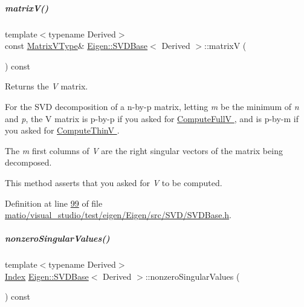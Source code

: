 \mbox{\label{group___s_v_d___module_a245a453b5e7347f737295c23133238c4}} 
\subparagraph{\texorpdfstring{matrix\+V()}{matrixV()}\hspace{0.1cm}{\footnotesize\ttfamily [2/2]}}
{\footnotesize\ttfamily template$<$typename Derived$>$ \\
const \hyperlink{group___core___module}{Matrix\+V\+Type}\& \hyperlink{group___s_v_d___module_class_eigen_1_1_s_v_d_base}{Eigen\+::\+S\+V\+D\+Base}$<$ Derived $>$\+::matrixV (\begin{DoxyParamCaption}{ }\end{DoxyParamCaption}) const\hspace{0.3cm}{\ttfamily [inline]}}

\begin{DoxyReturn}{Returns}
the {\itshape V} matrix.
\end{DoxyReturn}
For the S\+VD decomposition of a n-\/by-\/p matrix, letting {\itshape m} be the minimum of {\itshape n} and {\itshape p}, the V matrix is p-\/by-\/p if you asked for \hyperlink{group__enums_ggae3e239fb70022eb8747994cf5d68b4a9a52c6f7e80bbf9a42297c88f700245b51}{Compute\+FullV }, and is p-\/by-\/m if you asked for \hyperlink{group__enums_ggae3e239fb70022eb8747994cf5d68b4a9a1055e53fa95c8ae04a07ebb72cfafd95}{Compute\+ThinV }.

The {\itshape m} first columns of {\itshape V} are the right singular vectors of the matrix being decomposed.

This method asserts that you asked for {\itshape V} to be computed. 

Definition at line \hyperlink{matio_2visual__studio_2test_2eigen_2_eigen_2src_2_s_v_d_2_s_v_d_base_8h_source_l00099}{99} of file \hyperlink{matio_2visual__studio_2test_2eigen_2_eigen_2src_2_s_v_d_2_s_v_d_base_8h_source}{matio/visual\+\_\+studio/test/eigen/\+Eigen/src/\+S\+V\+D/\+S\+V\+D\+Base.\+h}.

\mbox{\label{group___s_v_d___module_afe8a555f38393a319a71ec0f0331c9ef}} 
\subparagraph{\texorpdfstring{nonzero\+Singular\+Values()}{nonzeroSingularValues()}\hspace{0.1cm}{\footnotesize\ttfamily [1/2]}}
{\footnotesize\ttfamily template$<$typename Derived$>$ \\
\hyperlink{group___s_v_d___module_a6229a37997eca1072b52cca5ee7a2bec}{Index} \hyperlink{group___s_v_d___module_class_eigen_1_1_s_v_d_base}{Eigen\+::\+S\+V\+D\+Base}$<$ Derived $>$\+::nonzero\+Singular\+Values (\begin{DoxyParamCaption}{ }\end{DoxyParamCaption}) const\hspace{0.3cm}{\ttfamily [inline]}}

